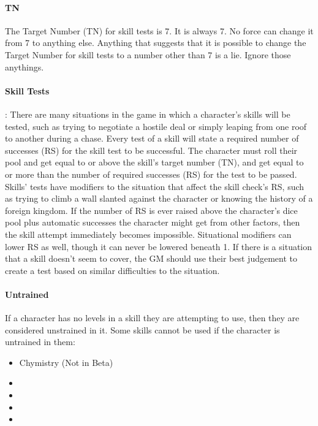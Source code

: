 \documentclass[oneside,11pt,english]{book}
\begin{document}
\paragraph{\label{par:TN}TN} The Target Number (TN) for skill tests is 7. It is always 7. No force can change it from 7 to anything else. Anything that suggests that it is possible to change the Target Number for skill tests to a number other than 7 is a lie. Ignore those anythings.
\paragraph{\label{par:Skill Tests}Skill Tests}: There are many situations in the game in which a character’s skills will be tested, such as trying to negotiate a hostile deal or simply leaping from one roof to another during a chase. Every test of a skill will state a required number of successes (RS) for the skill test to be successful. The character must roll their pool and get equal to or above the skill’s target number (TN), and get equal to or more than the number of required successes (RS) for the test to be passed. Skills’ tests have modifiers to the situation that affect the skill check’s RS, such as trying to climb a wall slanted against the character or knowing the history of a foreign kingdom. If the number of RS is ever raised above the character’s dice pool plus automatic successes the character might get from other factors, then the skill attempt immediately becomes impossible. Situational modifiers can lower RS as well, though it can never be lowered beneath 1. If there is a situation that a skill doesn’t seem to cover, the GM should use their best judgement to create a test based on similar difficulties to the situation.
\paragraph{\label{par:Untrained}Untrained} If a character has no levels in a skill they are attempting to use, then they are considered unstrained in it. Some skills cannot be used if the character is untrained in them:
\begin{itemize}
	\item Chymistry (Not in Beta)
	\item {}
	\item {}
	\item {}
	\item {}
\end{itemize}
\end{document}
